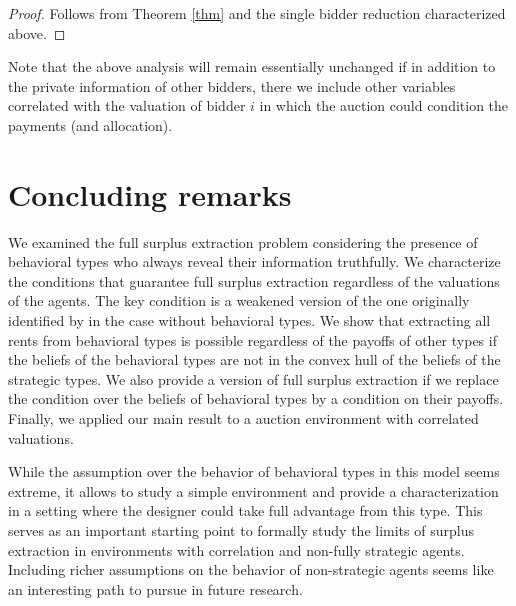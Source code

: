 \documentclass[12pt]{article}
\begin{document}
	\begin{proof}
		Follows from Theorem \ref{thm} and the single bidder reduction characterized above.
	\end{proof}

Note that the above analysis will remain essentially unchanged if in addition to the private information of other bidders, there we include other variables correlated with the valuation of bidder $i$ in which the auction could condition the payments (and allocation).

\section{Concluding remarks}\label{sec:end}

We examined the full surplus extraction problem considering the presence of behavioral types who always reveal their information truthfully. We characterize the conditions that guarantee full surplus extraction regardless of the valuations of the agents. The key condition is a weakened version of the one originally identified by \citet{cremermclean1988} in the case without behavioral types. We show that extracting all rents from behavioral types is possible regardless of the payoffs of other types if the beliefs of the behavioral types are not in the convex hull of the beliefs of the strategic types. We also provide a version of full surplus extraction if we replace the condition over the beliefs of behavioral types by a condition on their payoffs. Finally, we applied our main result to a auction environment with correlated valuations.

While the assumption over the behavior of behavioral types in this model seems extreme, it allows to study a simple environment and provide a characterization in a setting where the designer could take full advantage from this type. This serves as an important starting point to formally study the limits of surplus extraction in environments with correlation and non-fully strategic agents. Including richer assumptions on the behavior of non-strategic agents seems like an interesting path to pursue in future research.


{}
\end{document}
